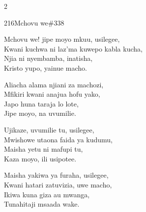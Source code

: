 \documentclass{article}
\begin{document}
\begin{multicols}{2}
\begin{hymn}{216}{Mchovu we}{\#338}
\begin{stanza}
Mchovu we! jipe moyo mkuu, usilegee,\\
Kwani kuchwa ni laz'ma kuwepo kabla kucha,\\
Njia ni nyembamba, inatisha,\\
Kristo yupo, yainue macho.
\end{stanza}
\begin{stanza}
Aliacha alama njiani za machozi,\\
Mfikiri kwani anajua hofu yako,\\
Japo huna taraja lo lote,\\
Jipe moyo, na uvumilie.
\end{stanza}
\begin{stanza}
Ujikaze, uvumilie tu, usilegee,\\
Mwishowe utaona faida ya kudumu,\\
Maisha yetu ni mafupi tu,\\
Kaza moyo, ili usipotee.
\end{stanza}
\begin{stanza}
Maisha yakiwa ya furaha, usilegee,\\
Kwani hatari zatuvizia, uwe macho,\\
Ikiwa kuna giza au mwanga,\\
Tunahitaji msaada wake.
\end{stanza}
\end{hymn}


\end{multicols}
\end{document}

